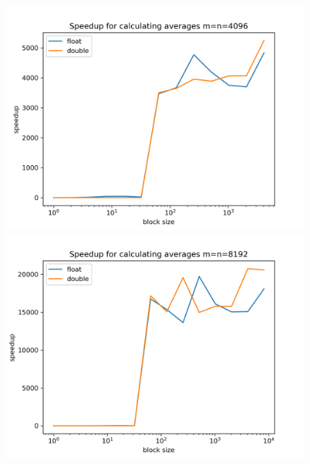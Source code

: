 \documentclass[a4paper]{article}
\begin{document}
\begin{figure}[h!]
\begin{minipage}{0.45\linewidth}
			\includegraphics[width=\linewidth]{../comparison_plots/reduce_plot_m4096.png}
		\end{minipage}%
		\begin{minipage}{0.45\linewidth}
			\centering
			\includegraphics[width=\linewidth]{../comparison_plots/reduce_plot_m8192.png}
		\end{minipage}
	\end{figure}



\end{document}
